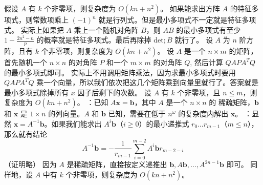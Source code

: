 {}假设 $A$ 有 $k$ 个非零项，则复杂度为 $O(kn + n^2)$。\markdownRendererInterblockSeparator
{}
\markdownRendererSectionEnd \markdownRendererSectionBegin
{}\markdownRendererInterblockSeparator
{}如果能求出方阵 $A$ 的特征多项式，则常数项乘上 $(-1)^n$ 就是行列式。但是最小多项式不一定就是特征多项式。\markdownRendererParagraphSeparator
{}实际上如果把 $A$ 乘上一个随机对角阵 $B$，则 $AB$ 的最小多项式有至少 $1 - \frac {2n^2 - n} p$ 的概率就是特征多项式。最后再除掉 $\text{det};B$ 就行了。\markdownRendererParagraphSeparator
{}设 $A$ 为 $n$ 阶方阵，且有 $k$ 个非零项，则复杂度为 $O(kn + n ^ 2)$。\markdownRendererInterblockSeparator
{}
\markdownRendererSectionEnd \markdownRendererSectionBegin
{}\markdownRendererInterblockSeparator
{}设 $A$ 是一个 $n\times m$ 的矩阵，首先随机一个 $n\times n$ 的对角阵 $P$ 和一个 $m\times m$ 的对角阵 $Q$, 然后计算 $Q A P A^T Q$ 的最小多项式即可。\markdownRendererParagraphSeparator
{}实际上不用调用矩阵乘法，因为求最小多项式时要用 $Q A P A^T Q$ 乘一个向量，所以我们依次把这几个矩阵乘到向量里就行了。答案就是最小多项式除掉所有 $x$ 因子后剩下的次数。\markdownRendererParagraphSeparator
{}设 $A$ 有 $k$ 个非零项，且 $n \le m$，则复杂度为 $O(kn + n ^ 2)$。\markdownRendererInterblockSeparator
{}
\markdownRendererSectionEnd \markdownRendererSectionBegin
{}\markdownRendererInterblockSeparator
{}：已知 $A \mathbf{x} = \mathbf{b}$，其中 $A$ 是一个 $n \times n$ 的  稀疏矩阵，$\mathbf{b}$ 和 $\mathbf{x}$ 是 $1 \times n$ 的列向量。$A$ 和 $\mathbf{b}$ 已知，需要在低于 $n^\omega$ 的复杂度内解出 $\mathbf{x}$。\markdownRendererParagraphSeparator
{}：显然 $\mathbf{x} = A^{-1} \mathbf{b}$。如果我们能求出 ${A^i \mathbf{b}}$（$i \ge 0$）的最小递推式 ${r_0 \dots r_{m - 1}}$（$m \le n$），那么就有结论\markdownRendererParagraphSeparator
{}$$A^{-1} \mathbf{b} = -\frac{1}{r_{m - 1}} \sum_{i = 0}^{m - 2} A^i \mathbf{b} r_{m - 2 - i}$$\markdownRendererParagraphSeparator
{}（证明略）\markdownRendererParagraphSeparator
{}因为 $A$ 是稀疏矩阵，直接按定义递推出 $\mathbf{b}, A \mathbf{b}, \dots, A^{2n - 1} \mathbf{b}$ 即可。\markdownRendererParagraphSeparator
{}同样地，设 $A$ 中有 $k$ 个非零项，则复杂度为 $O(kn + n^2)$。\markdownRendererInterblockSeparator
{}
\markdownRendererSectionEnd 
\markdownRendererSectionEnd \markdownRendererSectionBegin
{}\markdownRendererInterblockSeparator
{}\markdownRendererInterblockSeparator
